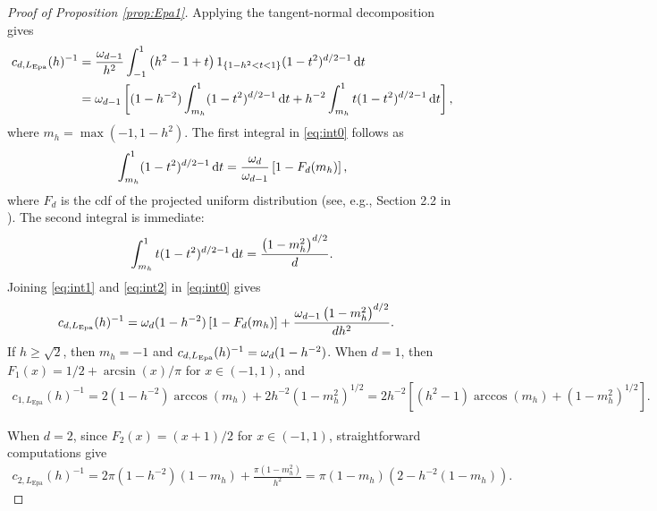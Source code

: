 \documentclass[oneside,11pt]{article}
\begin{document}
\begin{proof}[Proof of Proposition \ref{prop:Epa1}]
Applying the tangent-normal decomposition gives
\begin{align}
    c_{d,L_\mathrm{Epa}}(h)^{-1}%
    &=\frac{\om{d-1}}{h^2}\int_{-1}^1\lrp{h^2-1+t}1_{\{1-h^2<t<1\}}(1-t^2)^{d/2-1}\,\rd t\nonumber\\
    &=\om{d-1}\lrc{(1-h^{-2})\int_{m_h}^1(1-t^2)^{d/2-1}\,\rd t+h^{-2}\int_{m_h}^1t(1-t^2)^{d/2-1}\,\rd t},\label{eq:int0}
\end{align}
where $m_h=\max(-1,1-h^2)$. The first integral in \eqref{eq:int0} follows as
\begin{align}
    \int_{m_h}^1(1-t^2)^{d/2-1}\,\rd t%
    =\frac{\om{d}}{\om{d-1}}\lrc{1-F_d(m_h)},\label{eq:int1}
\end{align}
where $F_d$ is the cdf of the projected uniform distribution (see, e.g., Section 2.2 in \cite{Garcia-Portugues2022}). The second integral is immediate:
\begin{align}
    \int_{m_h}^1t(1-t^2)^{d/2-1}\,\rd t%
    =\frac{\lrp{1-m_h^2}^{d/2}}{d}.\label{eq:int2}
\end{align}
Joining \eqref{eq:int1} and \eqref{eq:int2} in \eqref{eq:int0} gives
\begin{align*}
    c_{d,L_\mathrm{Epa}}(h)^{-1}&=\omega_{d}(1-h^{-2})\left[1-F_d(m_h)\right]+\frac{\omega_{d-1}\left(1-m_h^2\right)^{d/2}}{dh^{2}}.
\end{align*}
If $h\geq\sqrt{2}$, then $m_h=-1$ and $c_{d,L_\mathrm{Epa}}(h)^{-1}=\omega_{d}(1-h^{-2})$. When $d=1$, then $F_1(x)=1/2+\arcsin(x)/\pi$ for $x\in(-1,1)$, and
\begin{align*}
    c_{1,L_\mathrm{Epa}}(h)^{-1}
    =2(1 - h^{-2}) \arccos(m_h)+2h^{-2}(1 - m_h^2)^{1/2}
    =2h^{-2}[(h^2-1)\arccos(m_h)+(1-m_h^2)^{1/2}].
\end{align*}

When $d=2$, since $F_2(x)=(x+1)/2$ for $x\in(-1,1)$, straightforward computations give
\begin{align*}
    c_{2,L_\mathrm{Epa}}(h)^{-1}%
    =2\pi(1-h^{-2})(1-m_h)+\frac{\pi(1-m_h^2)}{h^{2}}
    =\pi(1-m_h)(2-h^{-2}(1-m_h)).
\end{align*}
\end{proof}
\end{document}
